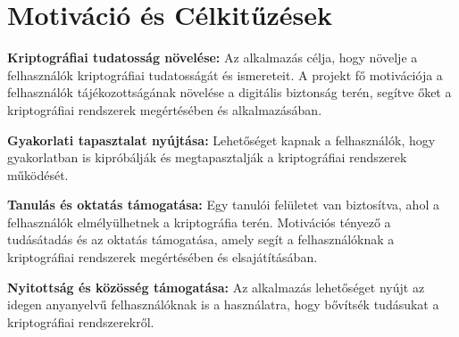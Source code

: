 \section {Motiváció és Célkitűzések}
\textbf{Kriptográfiai tudatosság növelése:}
Az alkalmazás célja, hogy növelje a felhasználók kriptográfiai tudatosságát és ismereteit. A projekt fő motivációja a felhasználók tájékozottságának növelése a digitális biztonság terén, segítve őket a kriptográfiai rendszerek megértésében és alkalmazásában.

\textbf{Gyakorlati tapasztalat nyújtása:}
Lehetőséget kapnak a felhasználók, hogy gyakorlatban is kipróbálják és megtapasztalják a kriptográfiai rendszerek működését.

\textbf{Tanulás és oktatás támogatása:}
Egy tanulói felületet van biztosítva, ahol a felhasználók elmélyülhetnek a kriptográfia terén. Motivációs tényező a tudásátadás és az oktatás támogatása, amely segít a felhasználóknak a kriptográfiai rendszerek megértésében és elsajátításában.

\textbf{Nyitottság és közösség támogatása:}
Az alkalmazás lehetőséget nyújt az idegen anyanyelvű felhasználóknak is a használatra, hogy bővítsék tudásukat a kriptográfiai rendszerekről.






